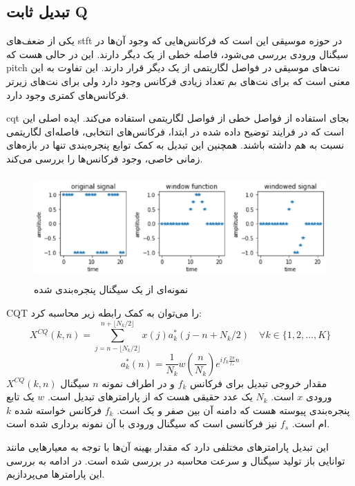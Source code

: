 \subsection{تبدیل ثابت Q}
یکی از ضعف‌های \gls{stft} در حوزه موسیقی این است که فرکانس‌هایی که وجود آن‌ها در
سیگنال ورودی بررسی می‌شود، فاصله خطی از یک دیگر دارند. این در حالی هست که
\gls{pitch} نت‌های موسیقی در فواصل لگاریتمی از یک دیگر قرار دارند. این تفاوت‌ به
این معنی است که برای نت‌های بم تعداد زیادی فرکانس وجود دارد ولی برای نت‌های
زیرتر فرکانس‌های کمتری وجود دارد.

\gls{cqt} بجای استفاده از فواصل خطی از فواصل لگاریتمی استفاده می‌کند. ایده اصلی
این است که در فرایند توضیح داده شده در ابتدا، فرکانس‌های انتخابی، فاصله‌ای
لگاریتمی نسبت به هم داشته باشند. همچنین این تبدیل به کمک توابع پنجره‌بندی تنها
در بازه‌های زمانی خاصی، وجود فرکانس‌ها را بررسی می‌کند.
\begin{figure}
    \centering
    \includegraphics[height=4cm]{./statics/windowed_signal.png}
    \caption{نمونه‌ای از یک سیگنال پنجره‌بندی شده}
\end{figure}

\gls{CQT} را می‌توان به کمک رابطه زیر محاسبه کرد:
\begin{equation}
    X^{CQ}(k, n) = \sum_{j=n-\lfloor N_k / 2 \rfloor}^{n+\lfloor N_k / 2 \rfloor} x(j)a_k^*(j-n+N_k/2) \quad \forall k \in \{1, 2, ..., K \}
\end{equation}
\begin{equation}
    a_k^*(n) = \frac{1}{N_k} w (\frac{n}{N_k}) e^{if_k\frac{2\pi}{f_s}n}
\end{equation}
$X^{CQ}(k, n)$ مقدار خروجی تبدیل برای فرکانس $f_k$ و در اطراف نمونه $n$ سیگنال
ورودی $x$ است. $N_k$ یک عدد حقیقی هست که از پارامترهای تبدیل است. $w$ یک تابع
پنجره‌بندی پیوسته هست که دامنه آن بین صفر و یک است. $f_k$ فرکانس خواسته شده‌
$k$ام است. $f_s$ نیز فرکانسی است که سیگنال ورودی با آن نمونه برداری شده است.

این تبدیل پارامترهای مختلفی دارد که مقدار بهینه آن‌ها با توجه به معیار‌هایی
مانند توانایی باز تولید سیگنال و سرعت محاسبه در \cite{schorkhuber2010constant}
بررسی شده است. در ادامه به بررسی این پارامترها می‌پردازیم.

